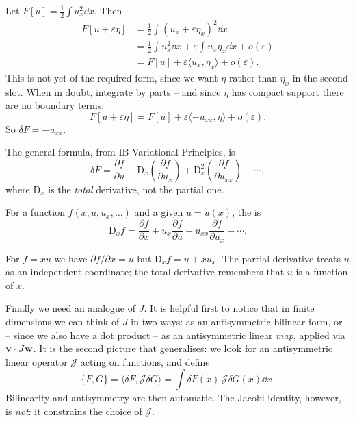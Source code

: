 \documentclass[a4paper]{scrartcl}
\newcommand{\D}{\mathrm{D}}
\newcommand{\ip}[2]{\langle #1, #2 \rangle}
\begin{document}
\begin{example}
	Let $F[u] = \frac{1}{2}\int u_x^2\dd x$. Then
	\begin{align*}
		F[u+\varepsilon\eta] &= \frac{1}{2}\int\left(u_x + \varepsilon\eta_x\right)^2\dd x\\
		&= \frac{1}{2}\int u_x^2\dd x + \varepsilon\int u_x\eta_x\dd x + o(\varepsilon)\\
		&= F[u] + \varepsilon\ip{u_x}{\eta_x} + o(\varepsilon).
	\end{align*}
	This is not yet of the required form, since we want $\eta$ rather than $\eta_x$ in the second slot. When in doubt, integrate by parts -- and since $\eta$ has compact support there are no boundary terms:
	$$
	F[u+\varepsilon\eta] = F[u] + \varepsilon\ip{-u_{xx}}{\eta} + o(\varepsilon).
	$$
	So $\delta F = -u_{xx}$.
\end{example}

The general formula, from IB Variational Principles, is
$$
\delta F = \frac{\partial f}{\partial u} - \D_x\left(\frac{\partial f}{\partial u_x}\right) + \D_x^2\left(\frac{\partial f}{\partial u_{xx}}\right) - \cdots,
$$
where $\D_x$ is the \emph{total} derivative, not the partial one.

\begin{definition}
	For a function $f(x, u, u_x, \dots)$ and a given $u = u(x)$, the  is
	$$
	\D_xf = \frac{\partial f}{\partial x} + u_x\frac{\partial f}{\partial u} + u_{xx}\frac{\partial f}{\partial u_x} + \cdots.
	$$
\end{definition}

\begin{example}
	For $f = xu$ we have $\partial f/\partial x = u$ but $\D_xf = u + xu_x$. The partial derivative treats $u$ as an independent coordinate; the total derivative remembers that $u$ is a function of $x$.
\end{example}

Finally we need an analogue of $J$. It is helpful first to notice that in finite dimensions we can think of $J$ in two ways: as an antisymmetric bilinear form, or -- since we also have a dot product -- as an antisymmetric linear \emph{map}, applied via $\mathbf{v}\cdot J\mathbf{w}$. It is the second picture that generalises: we look for an antisymmetric linear operator $\mathcal J$ acting on functions, and define
$$
\{F, G\} = \ip{\delta F}{\mathcal J\delta G} = \int\delta F(x)\,\mathcal J\delta G(x)\dd x.
$$
Bilinearity and antisymmetry are then automatic. The Jacobi identity, however, is \emph{not}: it constrains the choice of $\mathcal J$.
\end{document}

